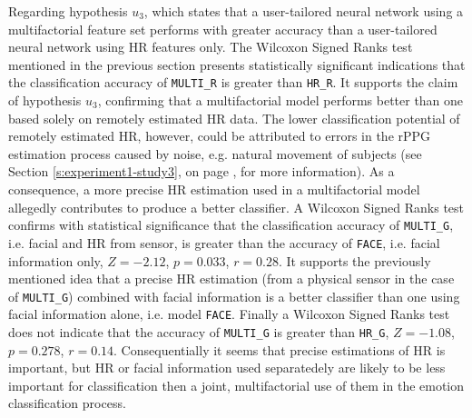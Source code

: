 Regarding hypothesis $u_3$, which states that a user-tailored neural network using a multifactorial feature set performs with greater accuracy than a user-tailored neural network using HR features only. The Wilcoxon Signed Ranks test mentioned in the previous section presents statistically significant indications that the classification accuracy of \texttt{MULTI\_R} is greater than \texttt{HR\_R}. It supports the claim of hypothesis $u_3$, confirming that a multifactorial model performs better than one based solely on remotely estimated HR data. The lower classification potential of remotely estimated HR, however, could be attributed to errors in the rPPG estimation process caused by noise, e.g. natural movement of subjects (see Section \ref{s:experiment1-study3}, on page \pageref{s:experiment1-study3}, for more information). As a consequence, a more precise HR estimation used in a multifactorial model allegedly contributes to produce a better classifier. A Wilcoxon Signed Ranks test confirms with statistical significance that the classification accuracy of \texttt{MULTI\_G}, i.e. facial and HR from sensor, is greater than the accuracy of \texttt{FACE}, i.e. facial information only, $Z=-2.12$, $p=0.033$, $r=0.28$. It supports the previously mentioned idea that a precise HR estimation (from a physical sensor in the case of \texttt{MULTI\_G}) combined with facial information is a better classifier than one using facial information alone, i.e. model \texttt{FACE}. Finally a Wilcoxon Signed Ranks test does not indicate that the accuracy of \texttt{MULTI\_G} is greater than \texttt{HR\_G}, $Z=-1.08$, $p=0.278$, $r=0.14$. Consequentially it seems that precise estimations of HR is important, but HR or facial information used separatedely are likely to be less important for classification then a joint, multifactorial use of them in the emotion classification process.

